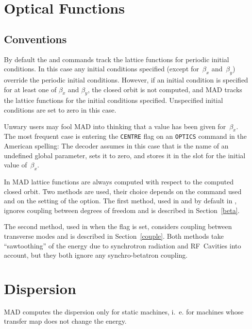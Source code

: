 \section{Optical Functions}

\subsection{Conventions}
By default the  and  commands track the
lattice functions for periodic initial conditions.
In this case any initial conditions specified
(except for~$\beta_x$ and~$\beta_y$)
override the periodic initial conditions. 
However, if an initial condition is specified for at least one
of $\beta_x$ and $\beta_y$, the closed orbit is not computed, and MAD
tracks the lattice functions for the initial conditions specified.
Unspecified initial conditions are set to zero in this case.

Unwary users may fool MAD into thinking that a value has been given
for~$\beta_x$.
The most frequent case is entering the {\tt CENTRE} flag on an
{\tt OPTICS} command in the American spelling:
The decoder assumes in this case that  is the name of an
undefined global parameter, sets it to zero, and stores it in the slot
for the initial value of~$\beta_x$.

In MAD lattice functions are always computed with respect to the
computed closed orbit.
Two methods are used,
their choice depends on the command used and on the setting of the
 option.
The first method, used in  and by default in
, ignores coupling between degrees of freedom and is
described in Section~\ref{beta}.

The second method,
used in  when the  flag is set,
considers coupling between transverse modes and is described in
Section~\ref{couple}.
Both methods take ``sawtoothing'' of the energy due to synchrotron
radiation and RF~Cavities into account,
but they both ignore any synchro-betatron coupling.

\section{Dispersion}
MAD computes the dispersion only for static machines,
i.~e. for machines whose transfer map does not change the energy.

